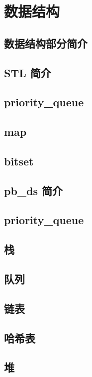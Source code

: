 \chapter{数据结构}
\section{数据结构部分简介}

  \section{STL 简介}
  
  
  \section{priority\_queue}
  
  \section{map}
  
  \section{bitset}
  
  \section{pb\_ds 简介}
  
  \section{priority\_queue}
  
\section{栈}

\section{队列}

\section{链表}

\section{哈希表}


\section{堆}

